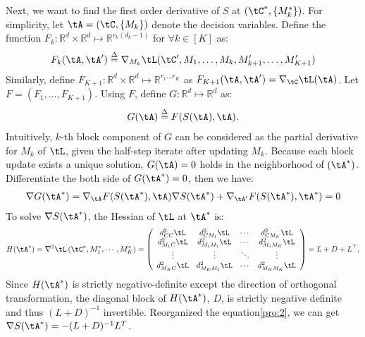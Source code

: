 \documentclass[11pt]{article}
\begin{document}
Next, we want to find the first order derivative of $S$ at $(\tC^*,\{M^*_k\})$. For simplicity, let $\tA = (\tC,\{M_k\})$ denote the decision variables. Define the function $F_k: \mathbb{R}^{d} \times \mathbb{R}^{d}  \mapsto \mathbb{R}^{r_k(d_k -1)}$ for $\forall k \in [K]$ as:
\begin{align*}
	F_k(\tA,\tA') \overset{\Delta}{=} \nabla_{M_k} \tL(\tC', M_1,\dots, M_k,M'_{k+1},\dots, M'_{K+1})
\end{align*}
Similarly, define $F_{K+1}:\mathbb{R}^{d} \times \mathbb{R}^{d}  \mapsto \mathbb{R}^{r_1 \dots r_K} $ as $ F_{K+1}(\tA, \tA' ) = \nabla_{\tC} \tL(\tA)$. Let $F = (F_1,\dots,F_{K+1})$. Using $F$, define $G: \mathbb{R}^{d}  \mapsto \mathbb{R}^{d}$ as:
\begin{align*}
	G(\tA) \overset{\Delta}{=} F(S(\tA) ,\tA).
\end{align*}
Intuitively, $k$-th block component of $G$ can be considered as the partial derivative for $M_k$ of $\tL$, given the half-step iterate after updating $M_k$. Because each block update exists a unique solution, $G(\tA) = 0$ holds in the neighborhood of $(\tA^*)$.  Differentiate the both side of $G(\tA^*) = 0$, then we have:
\begin{align}\label{pro:2}
	\nabla G(\tA^*) = \nabla_{\tA} F(S(\tA^*) ,\tA) \nabla S (\tA^*) + \nabla_{\tA'} F(S(\tA^*) ,\tA^*)  = 0
\end{align}
To solve $\nabla S(\tA^*)$, the Hessian of $\tL$ at $\tA^*$ is:
\begin{align*}
    H(\tA^*) =  \nabla^2 \tL\left(\tC^*, M_1^*,\cdots,M_K^* \right) =\left(\begin{array}{cccc}d_{CC}^{2} \tL &d_{CM_1}^{2} \tL  & \cdots & d_{CM_K}^{2} \tL \\ d_{M_1C}^{2} \tL  &d_{M_1 M_1}^{2} \tL & \cdots &  d_{M_1 M_K}^{2} \tL\\ \vdots & \vdots & \ddots & \vdots \\d_{M_KC}^{2} \tL& d_{M_K M_1}^{2} \tL & \cdots & d_{M_K M_K}^{2} \tL \end{array}\right)=L+D+L^{\top},
\end{align*}
Since $H(\tA^*)$ is strictly negative-definite except the direction of orthogonal transformation, the diagonal block of $H(\tA^*)$, $D$, is strictly negative definite and thus $(L+ D)^{-1}$ invertible. Reorganized the equation\ref{pro:2}, we can get $\nabla S(\tA^*) = -(L+D)^{-1} L^T$.
\end{document}
